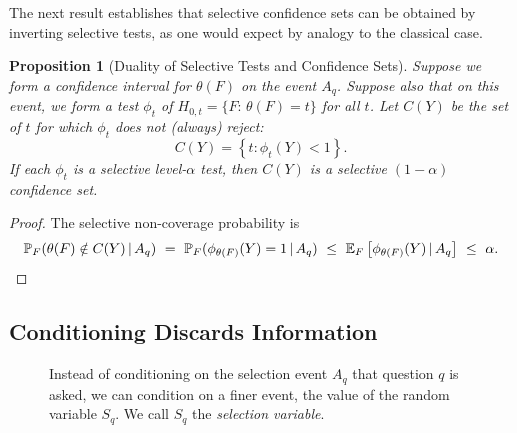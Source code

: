\documentclass{article}
\newtheorem{proposition}[theorem]{Proposition}
\theoremstyle{definition}
\begin{document}
The next result establishes that selective confidence sets can be obtained by inverting selective tests, as one would expect by analogy to the classical case.

\begin{proposition}[Duality of Selective Tests and Confidence Sets]
Suppose we form a confidence interval for $\theta(F)$ on the event $A_q$. Suppose also that on this event, we form a test $\phi_t$ of $H_{0, t} = \{F:\,\theta(F) = t\}$ for all $t$. Let $C(Y)$ be the set of $t$ for which $\phi_t$ does not (always) reject:
\begin{equation}
  C(Y) = \left\{t: \phi_t(Y) < 1 \right\}.
\end{equation}
If each $\phi_t$ is a selective level-$\alpha$ test, then $C(Y)$ is a selective $(1-\alpha)$ confidence set.
\end{proposition}
\begin{proof}
The selective non-coverage probability is
\begin{equation*}
\P_F(\theta(F) \notin C(Y) \gv A_q) \ = \ \P_F(\phi_{\theta(F)}(Y) = 1 \gv A_q) \ \leq\ \E_F\left[\phi_{\theta(F)}(Y) \gv A_q\right] \ \leq\ \alpha.
\end{equation*}
\end{proof}

\subsection{Conditioning Discards Information}\label{sec:consumes}

\begin{figure}
\begin{center}
\end{center}
\caption{Instead of conditioning on the selection event $A_q$ that question $q$ is asked, we can condition on a finer event, the value of the random variable $S_q$. We call $S_q$ the {\em selection variable}.}
\label{fig:finer}
\end{figure}
\end{document}
